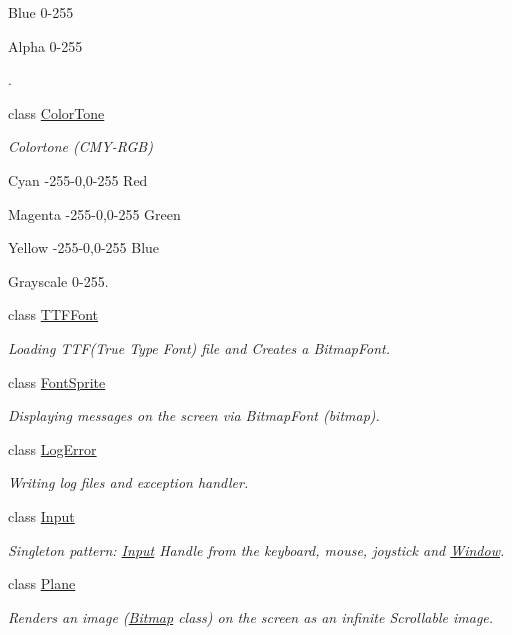\begin{DoxyCompactItemize}
\begin{DoxyCompactList}
 Blue 0-\/255 \par
 Alpha 0-\/255 \par
. \item\end{DoxyCompactList}\item 
class \hyperlink{class_f2_c_1_1_color_tone}{ColorTone}
\begin{DoxyCompactList}\small\item\em Colortone (CMY-\/RGB) \par
 Cyan -\/255-\/0,0-\/255 Red \par
 Magenta -\/255-\/0,0-\/255 Green \par
 Yellow -\/255-\/0,0-\/255 Blue \par
 Grayscale 0-\/255. \item\end{DoxyCompactList}\item 
class \hyperlink{class_f2_c_1_1_t_t_f_font}{TTFFont}
\begin{DoxyCompactList}\small\item\em Loading TTF(True Type Font) file and Creates a BitmapFont. \item\end{DoxyCompactList}\item 
class \hyperlink{class_f2_c_1_1_font_sprite}{FontSprite}
\begin{DoxyCompactList}\small\item\em Displaying messages on the screen via BitmapFont (bitmap). \item\end{DoxyCompactList}\item 
class \hyperlink{class_f2_c_1_1_log_error}{LogError}
\begin{DoxyCompactList}\small\item\em Writing log files and exception handler. \item\end{DoxyCompactList}\item 
class \hyperlink{class_f2_c_1_1_input}{Input}
\begin{DoxyCompactList}\small\item\em Singleton pattern: \hyperlink{class_f2_c_1_1_input}{Input} Handle from the keyboard, mouse, joystick and \hyperlink{class_f2_c_1_1_window}{Window}. \item\end{DoxyCompactList}\item 
class \hyperlink{class_f2_c_1_1_plane}{Plane}
\begin{DoxyCompactList}\small\item\em Renders an image (\hyperlink{class_f2_c_1_1_bitmap}{Bitmap} class) on the screen as an infinite Scrollable image. \item\end{DoxyCompactList}\item 

\end{DoxyCompactItemize}
